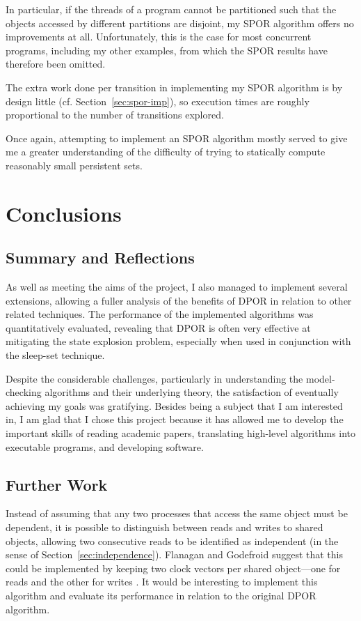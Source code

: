 \documentclass[12pt,a4paper,twoside,openany]{report}
\begin{document}
In particular, if the threads of
a program cannot be partitioned
such that the objects accessed by different
partitions are disjoint, my SPOR algorithm
offers no improvements at all. Unfortunately, this
is the case for most concurrent programs,
including my other examples, from which
the SPOR results have therefore been omitted.

The extra work done per transition
in implementing my SPOR
algorithm is by design little
(cf. Section~\ref{sec:spor-imp}), so
execution times are roughly proportional
to the number of transitions explored.

Once again, attempting to implement
an SPOR algorithm mostly served to give
me a greater understanding
of the difficulty of trying to
statically compute reasonably small persistent sets.

\chapter{Conclusions}

\section{Summary and Reflections}

As well as meeting the aims of the
project, I also
managed to implement several
extensions, allowing a fuller
analysis of the benefits of
DPOR in relation to other
related techniques.
The performance
of the implemented algorithms
was quantitatively evaluated,
revealing that DPOR is often
very effective at mitigating
the state explosion problem,
especially when used in
conjunction with the
sleep-set technique.

Despite the considerable
challenges, particularly in
understanding
the model-checking algorithms
and their underlying theory, the
satisfaction of eventually achieving
my goals was gratifying. Besides
being a subject that I am interested
in, I am glad that I chose this project because
it has allowed me to develop the important skills
of reading academic papers, translating high-level
algorithms into executable programs, and
developing software.


\section{Further Work}
Instead of assuming that any
two processes that access the
same object must be dependent,
it is possible to distinguish
between reads and writes to
shared objects, allowing
two consecutive reads to be identified
as independent (in the sense of
Section~\ref{sec:independence}).
Flanagan and Godefroid suggest
that this could be implemented
by keeping two clock vectors per
shared object---one for reads and
the other for writes \cite{flan05}.
It would
be interesting to implement
this algorithm and evaluate its
performance in relation to the
original DPOR algorithm.
\end{document}
